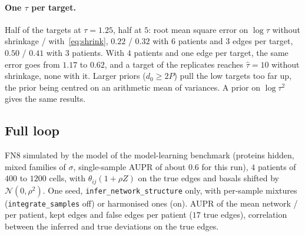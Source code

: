 \documentclass[a4paper, 11pt]{article}
\theoremstyle{plain}
\theoremstyle{remark}
\begin{document}
\paragraph{One $\tau$ per target.} Half of the targets at $\tau = 1.25$, half at $5$: root mean square error on $\log\tau$ without shrinkage / with~\eqref{eq:shrink}, $0.22$ / $0.32$ with $6$ patients and $3$ edges per target, $0.50$ / $0.41$ with $3$ patients. With $4$ patients and one edge per target, the same error goes from $1.17$ to $0.62$, and a target of the replicates reaches $\hat\tau = 10$ without shrinkage, none with it. Larger priors ($d_0 \ge 2P$) pull the low targets too far up, the prior being centred on an arithmetic mean of variances. A prior on $\log\tau^2$ gives the same results.

\subsection{Full loop}\label{sec:pipeline}

FN8 simulated by the model of the model-learning benchmark (proteins hidden, mixed families of $\sigma$, single-sample AUPR of about $0.6$ for this run), $4$ patients of $400$ to $1200$ cells, with $\theta_{ij} (1 + \rho Z)$ on the true edges and basals shifted by $\mathcal N(0, \rho^2)$. One seed, \texttt{infer\_network\_structure} only, with per-sample mixtures (\texttt{integrate\_samples} off) or harmonised ones (on). AUPR of the mean network / per patient, kept edges and false edges per patient ($17$ true edges), correlation between the inferred and true deviations on the true edges.
\end{document}
